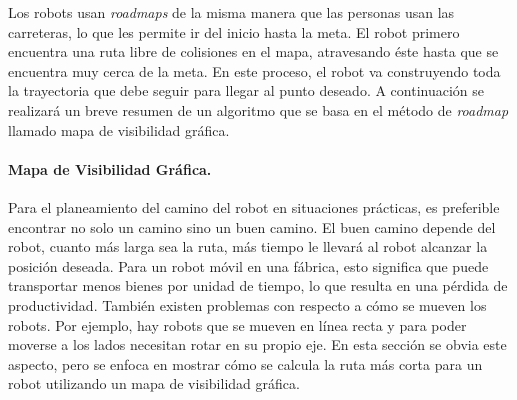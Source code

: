 Los robots usan \textit{roadmaps} de la misma manera que las personas usan 
las carreteras, lo que les permite ir del inicio hasta la meta. El robot 
primero encuentra una ruta libre de colisiones en el mapa, atravesando éste 
hasta que se encuentra muy cerca de la meta. En este proceso, el robot va 
construyendo toda la trayectoria que debe seguir para llegar al punto 
deseado. A continuación se realizará un breve resumen de un algoritmo que 
se basa en el método de \textit{roadmap} llamado mapa de visibilidad gr\'afica.




\paragraph{Mapa de Visibilidad Gr\'afica.} %

Para el planeamiento del camino del robot en situaciones prácticas, es preferible 
encontrar no solo un camino sino un buen camino. El buen camino depende del 
robot, cuanto más larga sea la ruta, más tiempo le llevará al robot 
alcanzar la posición deseada. Para un robot móvil en una fábrica, esto 
significa que puede transportar menos bienes por unidad de tiempo, lo que 
resulta en una pérdida de productividad. También existen problemas con 
respecto a cómo se mueven los robots. Por ejemplo, hay robots que se mueven 
en línea recta y para poder moverse a los lados necesitan rotar en su 
propio eje. En esta sección se obvia este aspecto, pero se enfoca en 
mostrar cómo se calcula la ruta más corta para un robot utilizando 
un mapa de visibilidad gráfica.

